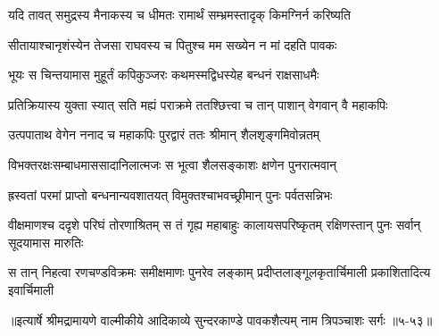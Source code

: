 \twolineshloka
{यदि तावत् समुद्रस्य मैनाकस्य च धीमतः}
{रामार्थं सम्भ्रमस्तादृक् किमग्निर्न करिष्यति} %

\twolineshloka
{सीतायाश्चानृशंस्येन तेजसा राघवस्य च}
{पितुश्च मम सख्येन न मां दहति पावकः} %

\twolineshloka
{भूयः स चिन्तयामास मुहूर्तं कपिकुञ्जरः}
{कथमस्मद्विधस्येह बन्धनं राक्षसाधमैः} %

\twolineshloka
{प्रतिक्रियास्य युक्ता स्यात् सति मह्यं पराक्रमे}
{ततश्छित्त्वा च तान् पाशान् वेगवान् वै महाकपिः} %

\twolineshloka
{उत्पपाताथ वेगेन ननाद च महाकपिः}
{पुरद्वारं ततः श्रीमान् शैलशृङ्गमिवोन्नतम्} %

\twolineshloka
{विभक्तरक्षःसम्बाधमाससादानिलात्मजः}
{स भूत्वा शैलसङ्काशः क्षणेन पुनरात्मवान्} %

\twolineshloka
{ह्रस्वतां परमां प्राप्तो बन्धनान्यवशातयत्}
{विमुक्तश्चाभवच्छ्रीमान् पुनः पर्वतसन्निभः} %

\threelineshloka
{वीक्षमाणश्च ददृशे परिघं तोरणाश्रितम्}
{स तं गृह्य महाबाहुः कालायसपरिष्कृतम्}
{रक्षिणस्तान् पुनः सर्वान् सूदयामास मारुतिः} %

\twolineshloka
{स तान् निहत्वा रणचण्डविक्रमः समीक्षमाणः पुनरेव लङ्काम्}
{प्रदीप्तलाङ्गूलकृतार्चिमाली प्रकाशितादित्य इवार्चिमाली} %


॥इत्यार्षे श्रीमद्रामायणे वाल्मीकीये आदिकाव्ये सुन्दरकाण्डे पावकशैत्यम् नाम त्रिपञ्चाशः सर्गः ॥५-५३॥
